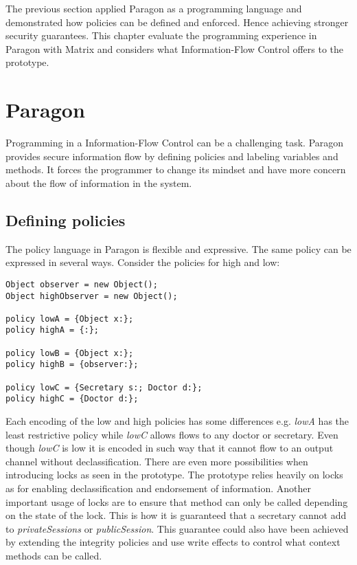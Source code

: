 The previous section applied Paragon as a programming language and demonstrated how policies can be defined and enforced. Hence achieving stronger security guarantees. This chapter evaluate the programming experience in Paragon with Matrix and considers what Information-Flow Control offers to the prototype.

\section{Paragon}

Programming in a Information-Flow Control can be a challenging task. Paragon provides secure information flow by defining policies and labeling variables and methods. It forces the programmer to change its mindset and have more concern about the flow of information in the system. 

\subsection{Defining policies} The policy language in Paragon is flexible and expressive. The same policy can be expressed in several ways. Consider the policies for high and low: 

\begin{lstlisting}
Object observer = new Object();
Object highObserver = new Object();

policy lowA = {Object x:};
policy highA = {:};

policy lowB = {Object x:};
policy highB = {observer:};

policy lowC = {Secretary s:; Doctor d:};
policy highC = {Doctor d:};
\end{lstlisting}

Each encoding of the low and high policies has some differences e.g. \emph{lowA} has the least restrictive policy while \emph{lowC} allows flows to any doctor or secretary. Even though \emph{lowC} is low it is encoded in such way that it cannot flow to an output channel without declassification. 
There are even more possibilities when introducing locks as seen in the prototype. The prototype relies heavily on locks as for enabling declassification and endorsement of information. Another important usage of locks are to ensure that method can only be called depending on the state of the lock. This is how it is guaranteed that a secretary cannot add to \emph{privateSessions} or \emph{publicSession}. This guarantee could also have been achieved by extending the integrity policies and use write effects to control what context methods can be called. 

